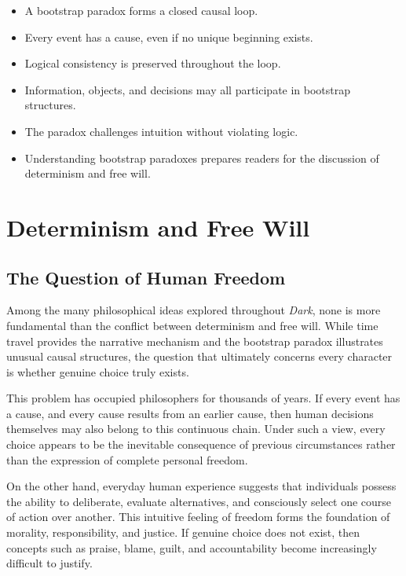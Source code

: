 \documentclass[12pt,oneside,openany]{book}
\begin{document}
\begin{tcolorbox}[colback=orange!8,colframe=orange!70!black,title=Chapter Takeaways]
\begin{itemize}
\item A bootstrap paradox forms a closed causal loop.
\item Every event has a cause, even if no unique beginning exists.
\item Logical consistency is preserved throughout the loop.
\item Information, objects, and decisions may all participate in bootstrap structures.
\item The paradox challenges intuition without violating logic.
\item Understanding bootstrap paradoxes prepares readers for the discussion of determinism and free will.
\end{itemize}
\end{tcolorbox}
\chapter{Determinism and Free Will}
\section{The Question of Human Freedom}

Among the many philosophical ideas explored throughout \textit{Dark}, none is
more fundamental than the conflict between determinism and free will. While
time travel provides the narrative mechanism and the bootstrap paradox
illustrates unusual causal structures, the question that ultimately concerns
every character is whether genuine choice truly exists.

This problem has occupied philosophers for thousands of years. If every event
has a cause, and every cause results from an earlier cause, then human
decisions themselves may also belong to this continuous chain. Under such a
view, every choice appears to be the inevitable consequence of previous
circumstances rather than the expression of complete personal freedom.

On the other hand, everyday human experience suggests that individuals possess
the ability to deliberate, evaluate alternatives, and consciously select one
course of action over another. This intuitive feeling of freedom forms the
foundation of morality, responsibility, and justice. If genuine choice does
not exist, then concepts such as praise, blame, guilt, and accountability
become increasingly difficult to justify.
\end{document}
